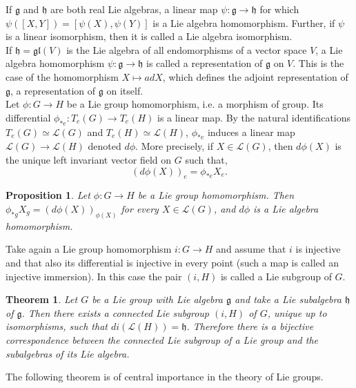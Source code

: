 \documentclass[a4paper,11pt]{article} %
\numberwithin{equation}{section} %
\numberwithin{figure}{section} %
\newtheorem{thm}{Theorem}
\newtheorem{prop}{Proposition}
\begin{document}
If  $\mathfrak{g}$ and  $\mathfrak{h}$ are both real Lie algebras, a linear map  $\psi:\mathfrak{g}\rightarrow\mathfrak{h}$ for which $\psi([X,Y])=[\psi(X),\psi(Y)]$ is a Lie algebra homomorphism. Further, if  $\psi$ is a linear isomorphism, then it is called a Lie algebra isomorphism.\\ 
If $\mathfrak{h}=\mathfrak{gl}(V)$ is the Lie algebra of all endomorphisms of a vector space $V$, a Lie algebra homomorphism $\psi:\mathfrak{g} \rightarrow\mathfrak{h}$ is called a  representation of $\mathfrak{g}$ on $V$. This is the case of the homomorphism $X\mapsto ad X$, which defines the adjoint representation of $\mathfrak{g}$, a representation of $\mathfrak{g}$ on itself. \\

Let $\phi:G\rightarrow H$ be a Lie group homomorphism, i.e. a morphism of group. Its differential $\phi_{*e}:T_e(G)\rightarrow T_e(H)$ is a linear map. By the natural identifications $T_e(G) \simeq \mathcal{L}(G)$ and $T_e(H) \simeq \mathcal{L}(H)$, $\phi_{*e}$  induces a linear map $\mathcal{L}(G)\rightarrow \mathcal{L}(H)$  denoted $d\phi$.
More precisely, if $X\in\mathcal{L}(G)$, then $d\phi(X)$ is the unique left invariant vector field on $G$ such that,
\begin{equation}
(d\phi(X))_e=\phi_{*e}X_e.
\end{equation}

\begin{prop} 
Let $\phi:G\rightarrow H$ be a Lie group homomorphism. Then $\phi_{*g}X_g=(d\phi (X))_{\phi(X)}$ for every $X\in\mathcal{L}(G)$, and $d\phi$ is a Lie algebra homomorphism.
\end{prop}

Take again a Lie group homomorphism $i:G\rightarrow H$ and assume that  $i$ is injective and that also its differential is injective in every point (such a map is called an injective immersion). In this case the pair $(i,H)$ is called a Lie subgroup of  $G$.

\begin{thm} 
Let $G$ be a Lie group with Lie algebra $\mathfrak{g}$ and take a Lie subalgebra $\mathfrak{h}$ of $\mathfrak{g}$. Then there exists a connected Lie subgroup $(i,H)$ of $G$, unique up to isomorphisms, such that $di(\mathcal{L}(H))=\mathfrak{h}$. Therefore there is a bijective correspondence between the connected Lie subgroup of a Lie group and the subalgebras of its Lie algebra.
\end{thm}

The following theorem is of central importance in the  theory of Lie groups.
\end{document}
